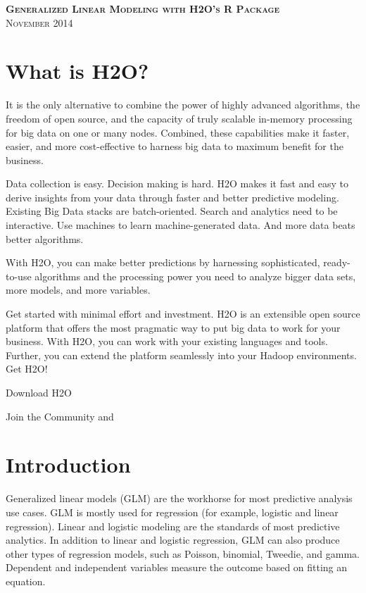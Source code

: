 \documentclass[11pt]{article}
\begin{document}
\thispagestyle{empty} %

\begin{center}
\textsc{\Large\bf{Generalized Linear Modeling  with H2O's R Package}}
\\
\bigskip
\textsc{November 2014}
\end{center}
\bigskip
\bigskip 
\bigskip
\bigskip
\tableofcontents

\newpage

\section{What is H2O?}

It is the only alternative to combine the power of highly advanced algorithms, the freedom of open source, and the capacity of truly scalable in-memory processing for big data on one or many nodes. Combined, these capabilities make it faster, easier, and more cost-effective to harness big data to maximum benefit for the business. 

Data collection is easy. Decision making is hard. H2O makes it fast and easy to derive insights from your data through faster and better predictive modeling. Existing Big Data stacks are batch-oriented. Search and analytics need to be interactive. Use machines to learn machine-generated data. And more data beats better algorithms. 

With H2O, you can make better predictions by harnessing sophisticated, ready-to-use algorithms and the processing power you need to analyze bigger data sets, more models, and more variables. 

Get started with minimal effort and investment. H2O is an extensible open source platform that offers the most pragmatic way to put big data to work for your business. With H2O, you can work with your existing languages and tools. Further, you can extend the platform seamlessly into your Hadoop environments. Get H2O!

Download H2O

Join the Community
 and 

\section{Introduction} \label{1}

Generalized linear models (GLM) are the workhorse for most predictive analysis use cases.  GLM is mostly used for regression (for example, logistic and linear regression).  Linear and logistic modeling are the standards of most predictive analytics. In addition to linear and logistic regression, GLM can also produce other types of regression models, such as Poisson, binomial, Tweedie, and gamma.  Dependent and independent variables measure the outcome based on fitting an equation. 
\end{document}

